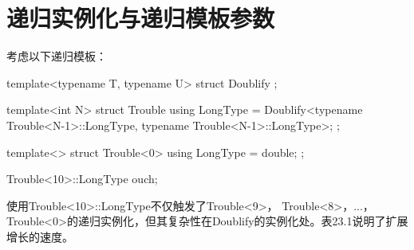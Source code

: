 \section{递归实例化与递归模板参数}
考虑以下递归模板：

\begin{cpp}
template<typename T, typename U>
struct Doublify {};

template<int N>
struct Trouble {
	using LongType = Doublify<typename Trouble<N-1>::LongType,
	typename Trouble<N-1>::LongType>;
};

template<>
struct Trouble<0> {
	using LongType = double;
};

Trouble<10>::LongType ouch;
\end{cpp}

使用Trouble<10>::LongType不仅触发了Trouble<9>， Trouble<8>，...，Trouble<0>的递归实例化，但其复杂性在Doublify的实例化处。表23.1说明了扩展增长的速度。

